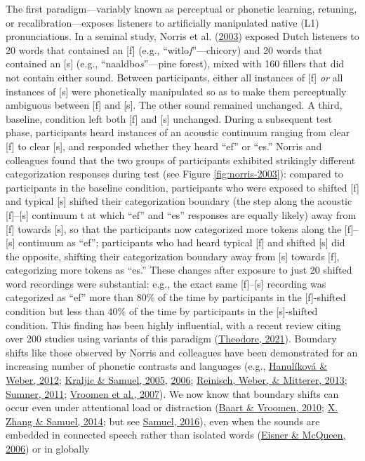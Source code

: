 \documentclass[
  11pt,
  english,
  man,floatsintext]{apa6}
\begin{document}
The first paradigm---variably known as perceptual or phonetic learning, retuning, or recalibration---exposes listeners to artificially manipulated native (L1) pronunciations. In a seminal study, Norris et al. (\protect\hyperlink{ref-norris2003}{2003}) exposed Dutch listeners to 20 words that contained an {[}f{]} (e.g., ``witlo\emph{f}''---chicory) and 20 words that contained an {[}s{]} (e.g., ``naaldbo\emph{s}''---pine forest), mixed with 160 fillers that did not contain either sound. Between participants, either all instances of {[}f{]} \emph{or} all instances of {[}s{]} were phonetically manipulated so as to make them perceptually ambiguous between {[}f{]} and {[}s{]}. The other sound remained unchanged. A third, baseline, condition left both {[}f{]} and {[}s{]} unchanged. During a subsequent test phase, participants heard instances of an acoustic continuum ranging from clear {[}f{]} to clear {[}s{]}, and responded whether they heard ``ef'' or ``es.'' Norris and colleagues found that the two groups of participants exhibited strikingly different categorization responses during test (see Figure \ref{fig:norris-2003}): compared to participants in the baseline condition, participants who were exposed to shifted {[}f{]} and typical {[}s{]} shifted their categorization boundary (the step along the acoustic {[}f{]}--{[}s{]} continuum t at which ``ef'' and ``es'' responses are equally likely) away from {[}f{]} towards {[}s{]}, so that the participants now categorized more tokens along the {[}f{]}--{[}s{]} continuum as ``ef''; participants who had heard typical {[}f{]} and shifted {[}s{]} did the opposite, shifting their categorization boundary away from {[}s{]} towards {[}f{]}, categorizing more tokens as ``es.'' These changes after exposure to just 20 shifted word recordings were substantial: e.g., the exact same {[}f{]}--{[}s{]} recording was categorized as ``ef'' more than 80\% of the time by participants in the {[}f{]}-shifted condition but less than 40\% of the time by participants in the {[}s{]}-shifted condition. This finding has been highly influential, with a recent review citing over 200 studies using variants of this paradigm (\protect\hyperlink{ref-theodore2021}{Theodore, 2021}). Boundary shifts like those observed by Norris and colleagues have been demonstrated for an increasing number of phonetic contrasts and languages (e.g., \protect\hyperlink{ref-hanulikova-weber2012}{Hanulíková \& Weber, 2012}; \protect\hyperlink{ref-kraljic-samuel2005}{Kraljic \& Samuel, 2005}, \protect\hyperlink{ref-kraljic-samuel2006}{2006}; \protect\hyperlink{ref-reinisch2013}{Reinisch, Weber, \& Mitterer, 2013}; \protect\hyperlink{ref-sumner2011}{Sumner, 2011}; \protect\hyperlink{ref-vroomen2007}{Vroomen et al., 2007}). We now know that boundary shifts can occur even under attentional load or distraction (\protect\hyperlink{ref-baart-vroomen2010}{Baart \& Vroomen, 2010}; \protect\hyperlink{ref-zhang-samuel2014}{X. Zhang \& Samuel, 2014}; but see \protect\hyperlink{ref-samuel2016}{Samuel, 2016}), even when the sounds are embedded in connected speech rather than isolated words (\protect\hyperlink{ref-eisner-mcqueen2006}{Eisner \& McQueen, 2006}) or in globally 
\end{document}
